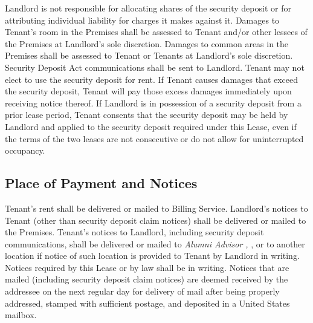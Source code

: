 \documentclass{article}
\begin{document}
Landlord is not responsible for allocating shares of the security deposit or for
attributing individual liability for charges it makes against it. Damages to
Tenant’s room in the Premises shall be assessed to Tenant and/or other lessees
of the Premises at Landlord’s sole discretion. Damages to common areas in the
Premises shall be assessed to Tenant or Tenants at Landlord’s sole discretion.
Security Deposit Act communications shall be sent to Landlord. Tenant may not
elect to use the security deposit for rent. If Tenant causes damages that exceed
the security deposit, Tenant will pay those excess damages immediately upon
receiving notice thereof. If Landlord is in possession of a security deposit
from a prior lease period, Tenant consents that the security deposit may be held
by Landlord and applied to the security deposit required under this Lease, even
if the terms of the two leases are not consecutive or do not allow for
uninterrupted occupancy.

\subsection{Place of Payment and Notices}
Tenant’s rent shall be delivered or mailed to Billing Service. Landlord’s
notices to Tenant (other than security deposit claim notices) shall be delivered
or mailed to the Premises. Tenant’s notices to Landlord, including security
deposit communications, shall be delivered or mailed to \emph{Alumni Advisor
\AlumniAdvisorName, \AlumniAdvisorAddress}, or to another location if notice of
such location is provided to Tenant by Landlord in writing. Notices required by
this Lease or by law shall be in writing. Notices that are mailed (including
security deposit claim notices) are deemed received by the addressee on the next
regular day for delivery of mail after being properly addressed, stamped with
sufficient postage, and deposited in a United States mailbox.

%
\end{document}
